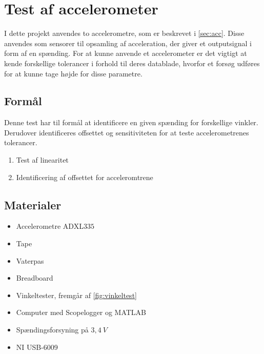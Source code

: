 \section{Test af accelerometer} 
\label{sec:test_acc}
I dette projekt anvendes to accelerometre, som er beskrevet i \autoref{sec:acc}. Disse anvendes som sensorer til opsamling af acceleration, der giver et outputsignal i form af en spænding. For at kunne anvende et accelerometer er det vigtigt at kende forskellige tolerancer i forhold til deres datablade, hvorfor et forsøg udføres for at kunne tage højde for disse parametre.

\subsection{Formål}\label{sec:acc_formaal}
Denne test har til formål at identificere en given spænding for forskellige vinkler. Derudover identificeres %
offsettet og sensitiviteten for at teste accelerometrenes tolerancer.

\begin{enumerate}
\item Test af linearitet
\item Identificering af offsettet for acceleromtrene %
\end{enumerate}

\subsection{Materialer}
\begin{itemize}
\item Accelerometre ADXL$335$
\item Tape
\item Vaterpas
\item Breadboard
\item Vinkeltester, fremgår af \autoref{fig:vinkeltest}
\item Computer med Scopelogger og MATLAB
\item Spændingsforsyning på $3,4~V$ 
\item NI USB-6009
\end{itemize}

